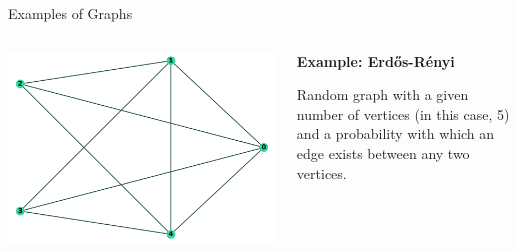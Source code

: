 \documentclass[unknownkeysallowed]{beamer}
\begin{document}
\begin{frame}{Examples of Graphs}

\begin{columns}

\begin{column}{.6\textwidth}
\includegraphics[width=.8\linewidth,valign=t]{assets/er}
\end{column}

\begin{column}{.4\textwidth}
\textbf{Example: Erd\H{o}s-R\'{e}nyi}

\vspace{5pt}

Random graph with a given number of vertices (in this case, 5) and a probability with which an edge exists between any two vertices.

\end{column}

\end{columns}


\end{frame}
\end{document}
